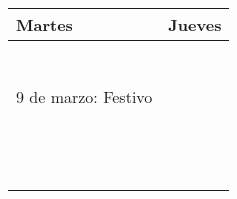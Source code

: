 \documentclass[a4paper,12pt]{article}
\begin{document}
\newcommand{\juevesA}{11 de febrero}
\newcommand{\juevesB}{18 de febrero}
\newcommand{\juevesC}{25 de febrero}
\newcommand{\juevesD}{4 de marzo}
\newcommand{\juevesE}{11 de marzo}
\newcommand{\juevesF}{18 de marzo}
\newcommand{\juevesG}{25 de marzo}
\newcommand{\juevesH}{8 de abril}
\newcommand{\juevesI}{15 de abril}
\newcommand{\juevesJ}{22 de abril}
\newcommand{\juevesK}{29 de abril}
\newcommand{\juevesL}{6 de mayo}
\newcommand{\juevesM}{13 de mayo}

\begin{tabular}{|l|l|}
   \hline
  Martes & Jueves \\ \hline \hline
  \nameref{cal:martesA} & \nameref{cal:juevesA} \\ \hline
  \nameref{cal:martesB} & \nameref{cal:juevesB} \\
  \nameref{cal:martesBb} &  \\  \hline
  \nameref{cal:martesC} & \nameref{cal:juevesC} \\
  \nameref{cal:martesCb} &  \\  \hline  \hline
  \nameref{cal:martesD} & \nameref{cal:juevesD} \\
  \nameref{cal:martesDb} &  \\  \hline
  9 de marzo: Festivo & \nameref{cal:juevesE} \\ \hline
  \nameref{cal:martesE} & \nameref{cal:juevesFb} \\
                        & \nameref{cal:juevesF} \\ \hline
  \nameref{cal:martesH} & \nameref{cal:juevesG} \\ \hline
  \nameref{cal:martesI} & \nameref{cal:juevesH} \\ 
                        & \nameref{cal:juevesHb} \\ \hline
  \nameref{cal:martesJ} & \nameref{cal:juevesI} \\
                        & \nameref{cal:juevesIb} \\
                        & \nameref{cal:juevesIc} \\ \hline
  \nameref{cal:martesK} & \nameref{cal:juevesJ} \\ \hline
  \nameref{cal:martesL} & \nameref{cal:juevesK} \\ \hline
  \nameref{cal:martesM} & \nameref{cal:juevesL} \\ \hline
  \nameref{cal:martesN} & \nameref{cal:juevesM} \\ \hline
  \nameref{cal:martesO} & \\ \hline
\end{tabular}
\end{document}
